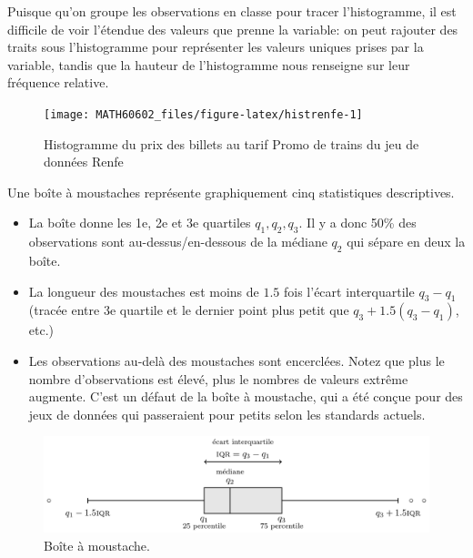 \documentclass[
  11pt,
  letterpaper,
]{book}
\providecommand{\tightlist}{%
  \setlength{\itemsep}{0pt}\setlength{\parskip}{0pt}}
\theoremstyle{definition}
\theoremstyle{definition}
\theoremstyle{definition}
\theoremstyle{remark}
\begin{document}
Puisque qu'on groupe les observations en classe pour tracer l'histogramme, il est difficile de voir l'étendue des valeurs que prenne la variable: on peut rajouter des traits sous l'histogramme pour représenter les valeurs uniques prises par la variable, tandis que la hauteur de l'histogramme nous renseigne sur leur fréquence relative.

\begin{figure}

{\centering \texttt{[image: MATH60602\_files/figure-latex/histrenfe-1]} 

}

\caption{Histogramme du prix des billets au tarif Promo de trains du jeu de données Renfe}\label{fig:histrenfe}
\end{figure}

Une boîte à moustaches représente graphiquement cinq statistiques descriptives.

\begin{itemize}
\tightlist
\item
  La boîte donne les 1e, 2e et 3e quartiles \(q_1, q_2, q_3\). Il y a donc 50\% des observations sont au-dessus/en-dessous de la médiane \(q_2\) qui sépare en deux la boîte.
\item
  La longueur des moustaches est moins de \(1.5\) fois l'écart interquartile \(q_3-q_1\) (tracée entre 3e quartile et le dernier point plus petit que \(q_3+1.5(q_3-q_1)\), etc.)
\item
  Les observations au-delà des moustaches sont encerclées. Notez que plus le nombre d'observations est élevé, plus le nombres de valeurs extrême augmente. C'est un défaut de la boîte à moustache, qui a été conçue pour des jeux de données qui passeraient pour petits selon les standards actuels.
\end{itemize}

\begin{figure}

{\centering \includegraphics[width=0.7\linewidth]{figures/01-intro-boiteamoustache} 

}

\caption{Boîte à moustache.}\label{fig:boiteamoustache}
\end{figure}
\end{document}
